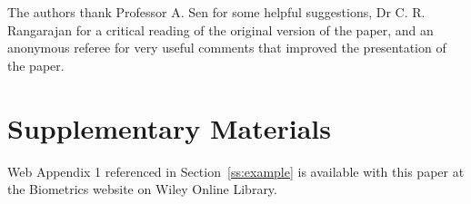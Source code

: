 \documentclass[useAMS,usenatbib]{biom}
\begin{document}
The authors thank Professor A. Sen for some helpful suggestions,
Dr C. R. Rangarajan for a critical reading of the original version of the
paper, and an anonymous referee for very useful comments that improved
the presentation of the paper.\vspace*{-8pt}


\section*{Supplementary Materials}

Web Appendix 1 referenced in Section~\ref{ss:example} is available
with this paper at the Biometrics website on Wiley Online Library.
\vspace*{-8pt}
\end{document}
